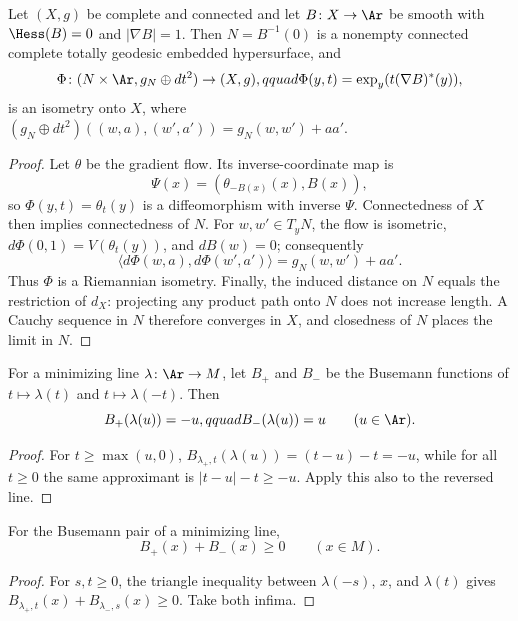 \begin{proposition}
Let $(X,g)$ be complete and connected and let $B\colon X\to\Ar$ be
smooth with $\Hess(B)=0$ and $|\nabla B|=1$. Then
$N=B^{-1}(0)$ is a nonempty connected complete totally geodesic embedded
hypersurface, and
$$\Phi\colon(N\times\Ar,g_N\oplus dt^2)\to(X,g),qquad
\Phi(y,t)=\exp_y(t(\nabla B)^*(y)),$$
is an isometry onto $X$, where
$(g_N\oplus dt^2)((w,a),(w',a'))=g_N(w,w')+aa'$.
\end{proposition}
\begin{proof}
\sketch
{}
Let $\theta$ be the gradient flow. Its inverse-coordinate map is
$$\Psi(x)=(\theta_{-B(x)}(x),B(x)),$$
so $\Phi(y,t)=\theta_t(y)$ is a diffeomorphism with inverse $\Psi$.
Connectedness of $X$ then implies connectedness of $N$. For
$w,w'\in T_yN$, the flow is isometric,
$d\Phi(0,1)=V(\theta_t(y))$, and $dB(w)=0$; consequently
$$\langle d\Phi(w,a),d\Phi(w',a')\rangle=g_N(w,w')+aa'.$$
Thus $\Phi$ is a Riemannian isometry. Finally, the induced distance on
$N$ equals the restriction of $d_X$: projecting any product path onto
$N$ does not increase length. A Cauchy sequence in $N$ therefore
converges in $X$, and closedness of $N$ places the limit in $N$.
\end{proof}

\begin{lemma}
\label{lem:busemann-along-line}
\leanok




For a minimizing line $\lambda\colon\Ar\to M$, let $B_+$ and $B_-$
be the Busemann functions of $t\mapsto\lambda(t)$ and
$t\mapsto\lambda(-t)$. Then
$$B_+(\lambda(u))=-u,qquad B_-(\lambda(u))=u\qquad(u\in\Ar).$$
\end{lemma}
\begin{proof}
\sketch
\leanok
{}
For $t\ge\max(u,0)$,
$B_{\lambda_+,t}(\lambda(u))=(t-u)-t=-u$, while for all $t\ge0$ the
same approximant is $|t-u|-t\ge-u$. Apply this also to the reversed
line.
\end{proof}

\begin{lemma}
\label{lem:busemann-pair-nonneg}
\leanok




For the Busemann pair of a minimizing line,
$$B_+(x)+B_-(x)\ge0\qquad(x\in M).$$
\end{lemma}
\begin{proof}
\sketch
\leanok
{}
For $s,t\ge0$, the triangle inequality between $\lambda(-s)$,
$x$, and $\lambda(t)$ gives
$B_{\lambda_+,t}(x)+B_{\lambda_-,s}(x)\ge0$. Take both infima.
\end{proof}


